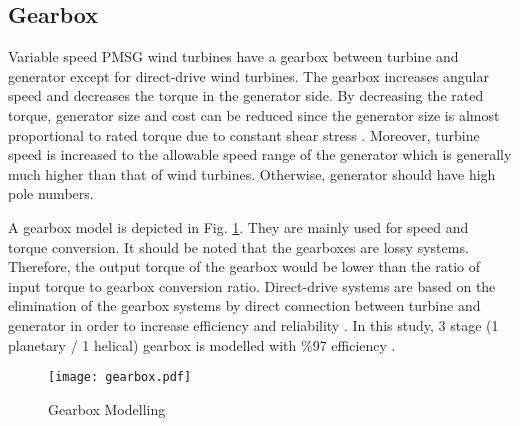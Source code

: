 \subsection{Gearbox}  
Variable speed PMSG wind turbines have a gearbox between turbine and generator except for direct-drive wind turbines. The gearbox increases angular speed and decreases the torque in the generator side. By decreasing the rated torque, generator size and cost can be reduced since the generator size is almost proportional to rated torque due to constant shear stress \cite{Polinder2013aa}. Moreover, turbine speed is increased to the allowable speed range of the generator which is generally much higher than that of wind turbines. Otherwise, generator should have high pole numbers. \par
A gearbox model is depicted in Fig. \ref{gearboxmodel}. They are mainly used for speed and torque conversion. It should be noted that the gearboxes are lossy systems. Therefore, the output torque of the gearbox would be lower than the ratio of input torque to gearbox conversion ratio. Direct-drive systems are based on the elimination of the gearbox systems by direct connection between turbine and generator in order to increase efficiency and reliability \cite{Chen2009b}. In this study, 3 stage (1 planetary / 1 helical) gearbox is modelled with \%97 efficiency \cite{UKONSAARI2016}. 
\begin{figure}[h!]
	\centering
	\texttt{[image: gearbox.pdf]}
	\caption{Gearbox Modelling}
	\label{gearboxmodel}
\end{figure}
